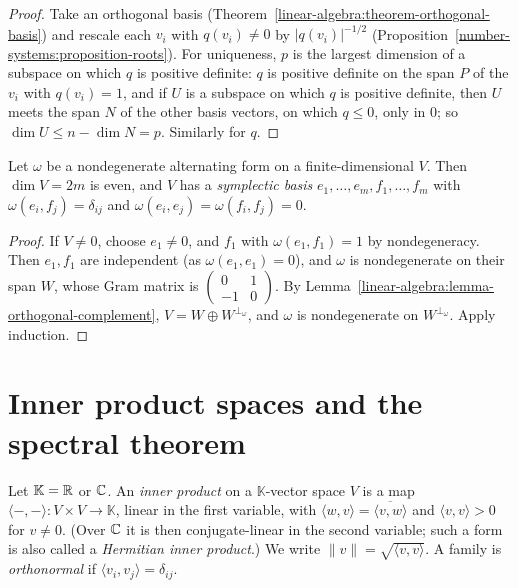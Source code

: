 \begin{proof}
Take an orthogonal basis (Theorem~\ref{linear-algebra:theorem-orthogonal-basis}) and rescale each
$v_i$ with $q(v_i) \neq 0$ by $|q(v_i)|^{-1/2}$ (Proposition~\ref{number-systems:proposition-roots}).
For uniqueness, $p$ is the largest dimension of a subspace on which $q$ is positive definite: $q$ is
positive definite on the span $P$ of the $v_i$ with $q(v_i) = 1$, and if $U$ is a subspace on which $q$ is
positive definite, then $U$ meets the span $N$ of the other basis vectors, on which $q \leq 0$, only in $0$;
so $\dim U \leq n - \dim N = p$. Similarly for $q$.
\end{proof}

\begin{theorem}\label{linear-algebra:theorem-symplectic-basis}
Let $\omega$ be a nondegenerate alternating form on a finite-dimensional $V$. Then $\dim V = 2m$ is even, and $V$
has a \emph{symplectic basis} $e_1, \ldots, e_m, f_1, \ldots, f_m$ with $\omega(e_i, f_j) = \delta_{ij}$ and
$\omega(e_i, e_j) = \omega(f_i, f_j) = 0$.
\end{theorem}

\begin{proof}
If $V \neq 0$, choose $e_1 \neq 0$, and $f_1$ with $\omega(e_1, f_1) = 1$ by nondegeneracy. Then $e_1, f_1$ are
independent (as $\omega(e_1, e_1) = 0$), and $\omega$ is nondegenerate on their span $W$, whose Gram matrix is
$\begin{pmatrix} 0 & 1 \\ -1 & 0 \end{pmatrix}$. By Lemma~\ref{linear-algebra:lemma-orthogonal-complement},
$V = W \oplus W^{\perp_\omega}$, and $\omega$ is nondegenerate on $W^{\perp_\omega}$. Apply induction.
\end{proof}

\section{Inner product spaces and the spectral theorem}\label{linear-algebra:section-inner-product}

\begin{definition}\label{linear-algebra:definition-inner-product}
Let $\mathbb{K} = \mathbb{R}$ or $\mathbb{C}$. An \emph{inner product} on a $\mathbb{K}$-vector space $V$ is a map
$\langle -, - \rangle \colon V \times V \to \mathbb{K}$, linear in the first variable, with
$\langle w, v \rangle = \overline{\langle v, w \rangle}$ and $\langle v, v \rangle > 0$ for $v \neq 0$. (Over $\mathbb{C}$ it is then
conjugate-linear in the second variable; such a form is also called a \emph{Hermitian inner
product}.) We write $\|v\| = \sqrt{\langle v, v \rangle}$. A family is \emph{orthonormal} if
$\langle v_i, v_j \rangle = \delta_{ij}$.
\end{definition}

